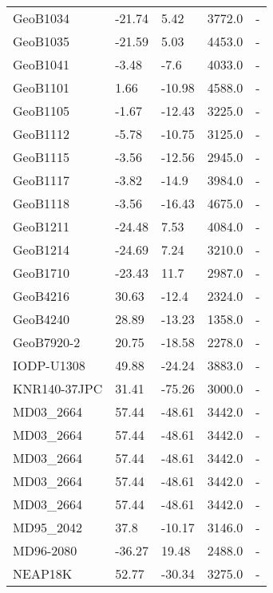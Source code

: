 \begin{longtable}{lllrl}
     GeoB1034 &   -21.74 &      5.42 &     3772.0 &         - \\
     GeoB1035 &   -21.59 &      5.03 &     4453.0 &         - \\
     GeoB1041 &    -3.48 &      -7.6 &     4033.0 &         - \\
     GeoB1101 &     1.66 &    -10.98 &     4588.0 &         - \\
     GeoB1105 &    -1.67 &    -12.43 &     3225.0 &         - \\
     GeoB1112 &    -5.78 &    -10.75 &     3125.0 &         - \\
     GeoB1115 &    -3.56 &    -12.56 &     2945.0 &         - \\
     GeoB1117 &    -3.82 &     -14.9 &     3984.0 &         - \\
     GeoB1118 &    -3.56 &    -16.43 &     4675.0 &         - \\
     GeoB1211 &   -24.48 &      7.53 &     4084.0 &         - \\
     GeoB1214 &   -24.69 &      7.24 &     3210.0 &         - \\
     GeoB1710 &   -23.43 &      11.7 &     2987.0 &         - \\
     GeoB4216 &    30.63 &     -12.4 &     2324.0 &         - \\
     GeoB4240 &    28.89 &    -13.23 &     1358.0 &         - \\
   GeoB7920-2 &    20.75 &    -18.58 &     2278.0 &         - \\
   IODP-U1308 &    49.88 &    -24.24 &     3883.0 &         - \\
 KNR140-37JPC &    31.41 &    -75.26 &     3000.0 &         - \\
    MD03\_2664 &    57.44 &    -48.61 &     3442.0 &         - \\
    MD03\_2664 &    57.44 &    -48.61 &     3442.0 &         - \\
    MD03\_2664 &    57.44 &    -48.61 &     3442.0 &         - \\
    MD03\_2664 &    57.44 &    -48.61 &     3442.0 &         - \\
    MD03\_2664 &    57.44 &    -48.61 &     3442.0 &         - \\
    MD95\_2042 &     37.8 &    -10.17 &     3146.0 &         - \\
    MD96-2080 &   -36.27 &     19.48 &     2488.0 &         - \\
      NEAP18K &    52.77 &    -30.34 &     3275.0 &         - \\

\end{longtable}
